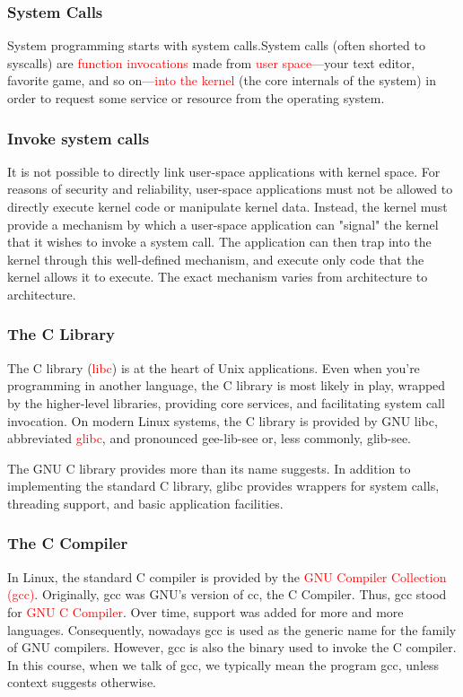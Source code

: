 \documentclass{beamer}
\begin{document}
\begin{frame}
\frametitle{System Calls}
System programming starts with system calls.System calls (often shorted to syscalls) are \textcolor{red}{function invocations} made from \textcolor{red}{user space}—your text editor, favorite game, and so on—\textcolor{red}{into the kernel} (the core internals of the system) in order to request some service or resource from the operating system. 
\end{frame}
\begin{frame}
\frametitle{Invoke system calls}
It is not possible to directly link user-space applications with kernel space. For reasons of security and reliability, user-space applications must not be allowed to directly execute kernel code or manipulate kernel data. Instead, the kernel must provide a mechanism by which a user-space application can "signal" the kernel that it wishes to invoke a system call. The application can then trap into the kernel through this well-defined mechanism, and execute only code that the kernel allows it to execute. The exact mechanism varies from architecture to architecture.
\end{frame}


\begin{frame}
\frametitle{The C Library}
The C library (\textcolor{red}{libc}) is at the heart of Unix applications. Even when you're programming in another language, the C library is most likely in play, wrapped by the higher-level libraries, providing core services, and facilitating system call invocation. On modern Linux systems, the C library is provided by GNU libc, abbreviated \textcolor{red}{glibc}, and pronounced gee-lib-see or, less commonly, glib-see.

The GNU C library provides more than its name suggests. In addition to implementing the standard C library, glibc provides wrappers for system calls, threading support, and basic application facilities.
\end{frame}

\begin{frame}
\frametitle{The C Compiler}
In Linux, the standard C compiler is provided by the \textcolor{red}{GNU Compiler Collection (gcc)}. Originally, gcc was GNU's version of cc, the C Compiler. Thus, gcc stood for \textcolor{red}{GNU C Compiler}. Over time, support was added for more and more languages. Consequently, nowadays gcc is used as the generic name for the family of GNU compilers. However, gcc is also the binary used to invoke the C compiler. In this course, when we talk of gcc, we typically mean the program gcc, unless context suggests otherwise.

\end{frame}
\end{document}
